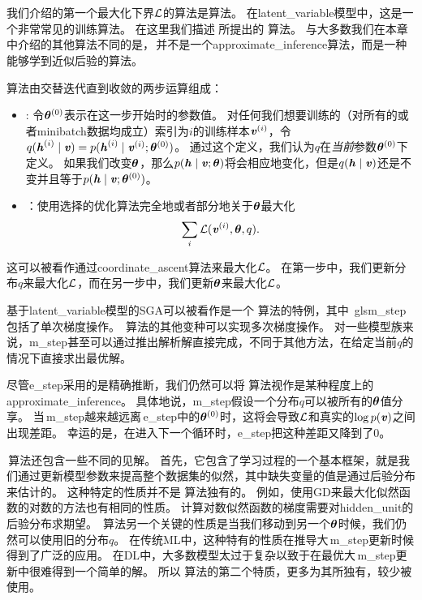 \section{}
\label{sec:expectation_maximization}

我们介绍的第一个最大化下界$\mathcal{L}$的算法是算法。
在\gls{latent_variable}模型中，这是一个非常常见的训练算法。
在这里我们描述 \citet{emview} 所提出的\,\,算法。
与大多数我们在本章中介绍的其他算法不同的是，\,并不是一个\gls{approximate_inference}算法，而是一种能够学到近似后验的算法。


算法由交替迭代直到收敛的两步运算组成：
\begin{itemize}
\item {}: 令${\boldsymbol{\theta}^{(0)}}$表示在这一步开始时的参数值。
对任何我们想要训练的（对所有的或者\gls{minibatch}数据均成立）索引为$i$的训练样本$\boldsymbol{\mathit{v}}^{(i)}$，令$q(\boldsymbol{\mathit{h}}^{(i)}\mid \boldsymbol{\mathit{v}}) = p(\boldsymbol{\mathit{h}}^{(i)}\mid\boldsymbol{\mathit{v}}^{(i)};\boldsymbol{\theta}^{(0)})$。
通过这个定义，我们认为$q$在\emph{当前}参数$\boldsymbol{\theta}^{(0)}$下定义。
如果我们改变$\boldsymbol{\theta}$，那么$p(\boldsymbol{\mathit{h}}\mid\boldsymbol{\mathit{v}};\boldsymbol{\theta})$将会相应地变化，但是$q(\boldsymbol{\mathit{h}}\mid\boldsymbol{\mathit{v}})$还是不变并且等于$p(\boldsymbol{\mathit{h}}\mid\boldsymbol{\mathit{v}};\boldsymbol{\theta}^{(0)})$。
\item {}：使用选择的优化算法完全地或者部分地关于$\boldsymbol{\theta}$最大化
\begin{align}
\sum_i \mathcal{L}(\boldsymbol{\mathit{v}}^{(i)},\boldsymbol{\theta},q).
\end{align}
\end{itemize}


这可以被看作通过\gls{coordinate_ascent}算法来最大化$\mathcal{L}$。
在第一步中，我们更新分布$q$来最大化$\mathcal{L}$，而在另一步中，我们更新$\boldsymbol{\theta}$来最大化$\mathcal{L}$。


基于\gls{latent_variable}模型的\gls{SGA}可以被看作是一个\,\,算法的特例，其中~gls{m_step}包括了单次梯度操作。
\,算法的其他变种可以实现多次梯度操作。
对一些模型族来说，\gls{m_step}甚至可以通过推出解析解直接完成，不同于其他方法，在给定当前$q$的情况下直接求出最优解。


尽管\gls{e_step}采用的是精确推断，我们仍然可以将\,\,算法视作是某种程度上的\gls{approximate_inference}。
具体地说，\gls{m_step}假设一个分布$q$可以被所有的$\boldsymbol{\theta}$值分享。
当\,\gls{m_step}越来越远离\,\gls{e_step}中的$\boldsymbol{\theta}^{(0)}$时，这将会导致$\mathcal{L}$和真实的$\log p(\boldsymbol{\mathit{v}})$之间出现差距。
幸运的是，在进入下一个循环时，\gls{e_step}把这种差距又降到了$0$。



\,算法还包含一些不同的见解。
首先，它包含了学习过程的一个基本框架，就是我们通过更新模型参数来提高整个数据集的似然，其中缺失变量的值是通过后验分布来估计的。
这种特定的性质并不是\,\,算法独有的。
例如，使用\gls{GD}来最大化似然函数的对数的方法也有相同的性质。
计算对数似然函数的梯度需要对\gls{hidden_unit}的后验分布求期望。 
\,算法另一个关键的性质是当我们移动到另一个$\boldsymbol{\theta}$时候，我们仍然可以使用旧的分布$q$。
在传统\gls{ML}中，这种特有的性质在推导大\,\gls{m_step}更新时候得到了广泛的应用。
在\gls{DL}中，大多数模型太过于复杂以致于在最优大\,\gls{m_step}更新中很难得到一个简单的解。
所以\,\,算法的第二个特质，更多为其所独有，较少被使用。


